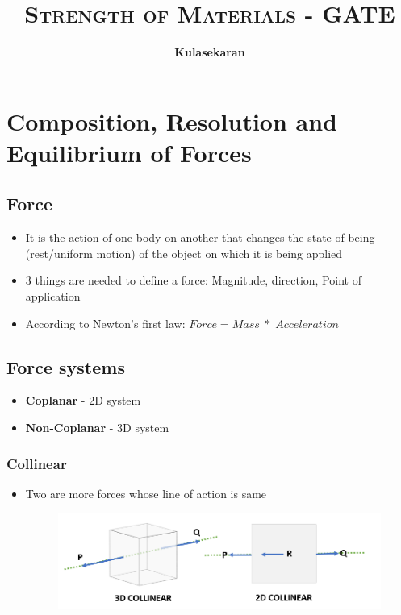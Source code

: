 \documentclass[8pt]{report}
\title{\Huge{\textsc{Strength of Materials - GATE}}}
\author{\huge{\textbf{Kulasekaran}}}
\begin{document}
\maketitle
\tableofcontents
\chapter{Composition, Resolution and Equilibrium of Forces}
\section{Force}
	\begin{itemize}
		\item It is the action of one body on another that changes the state of being (rest/uniform motion) of the object on which it is being applied
		\item 3 things are needed to define a force: Magnitude, direction, Point of application
		\item According to Newton's first law: $\boxed{Force = Mass\;*\;Acceleration}$
	\end{itemize}\hrulefill
\section{Force systems}
	\begin{itemize}
		\item \textbf{Coplanar} - 2D system
		\item \textbf{Non-Coplanar} - 3D system
	\end{itemize}
	\subsection{Collinear}
		\begin{itemize}
			\item Two are more forces whose line of action is same
			\begin{figure}[H]
				\centering
				\includegraphics[scale=0.5]{collinear.png}
			\end{figure}
		\end{itemize}
\end{document}
